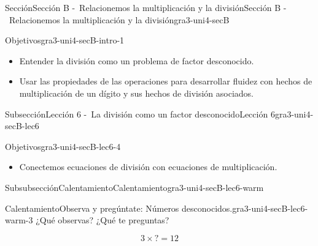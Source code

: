 \documentclass[twoside,10pt,]{article}
\begin{document}
\typeout{************************************************}
%
\begin{sectionptx}{Sección}{Sección B -~Relacionemos la multiplicación y la división}{}{Sección B -~Relacionemos la multiplicación y la división}{}{}{gra3-uni4-secB}
\begin{introduction}{}%
\begin{objectives}{Objetivos}{gra3-uni4-secB-intro-1}
%
\begin{itemize}[label=\textbullet]
\item{}Entender la división como un problema de factor desconocido.%
\item{}Usar las propiedades de las operaciones para desarrollar fluidez con hechos de multiplicación de un dígito y sus hechos de división asociados.%
\end{itemize}
\end{objectives}
\end{introduction}%
%
%
\typeout{************************************************}
\typeout{************************************************}
%
\begin{subsectionptx}{Subsección}{Lección 6 -~La división como un factor desconocido}{}{Lección 6}{}{}{gra3-uni4-secB-lec6}
\begin{objectives}{Objetivos}{gra3-uni4-secB-lec6-4}
%
\begin{itemize}[label=\textbullet]
\item{}Conectemos ecuaciones de división con ecuaciones de multiplicación.%
\end{itemize}
\end{objectives}
%
%
\typeout{************************************************}
\typeout{************************************************}
%
\begin{subsubsectionptx}{Subsubsección}{Calentamiento}{}{Calentamiento}{}{}{gra3-uni4-secB-lec6-warm}
\begin{exploration}{Calentamiento}{Observa y pregúntate: Números desconocidos.}{gra3-uni4-secB-lec6-warm-3}%
¿Qué observas? ¿Qué te preguntas?%
\begin{sidebyside}{2}{0}{0}{0}%
\begin{sbspanel}{0.5}%
%
\begin{equation*}
3\times {?} =12
\end{equation*}
%
\end{sbspanel}%

\end{sidebyside}
\end{exploration}
\end{subsubsectionptx}
\end{subsectionptx}
\end{sectionptx}
\end{document}
